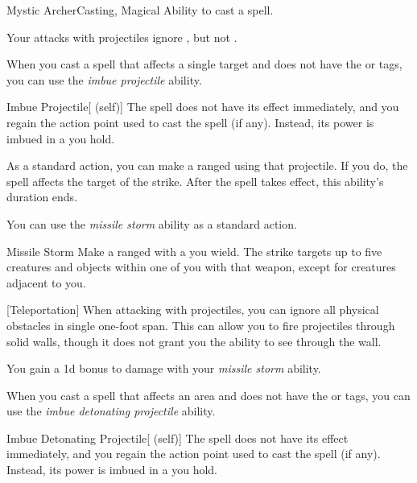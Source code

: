     \begin{feat}{Mystic Archer}{Casting, Magical}
        \featpre Ability to cast a spell.

         Your attacks with projectiles ignore , but not .

         When you cast a spell that affects a single target and does not have the  or  tags,
            you can use the \textit{imbue projectile} ability.
        \begin{attuneability}{Imbue Projectile}[ (self)]
            The spell does not have its effect immediately, and you regain the action point used to cast the spell (if any).
            Instead, its power is imbued in a  you hold.

            As a standard action, you can make a ranged  using that projectile.
            If you do, the spell affects the target of the strike.
            After the spell takes effect, this ability's duration ends.
        \end{attuneability}

         You can use the \textit{missile storm} ability as a standard action.
        \begin{apability}{Missile Storm}
            Make a ranged  with a  you wield.
            The strike targets up to five creatures and objects within one  of you with that weapon, except for creatures adjacent to you.
        \end{apability}

        [Teleportation] When attacking with projectiles, you can ignore all physical obstacles in single one-foot span.
        This can allow you to fire projectiles through solid walls, though it does not grant you the ability to see through the wall.

         You gain a \plus1d bonus to damage with your \textit{missile storm} ability.

         When you cast a spell that affects an area and does not have the  or  tags,
            you can use the \textit{imbue detonating projectile} ability.
        \begin{attuneability}{Imbue Detonating Projectile}[ (self)]
            The spell does not have its effect immediately, and you regain the action point used to cast the spell (if any).
            Instead, its power is imbued in a  you hold.


\end{attuneability}
\end{feat}
